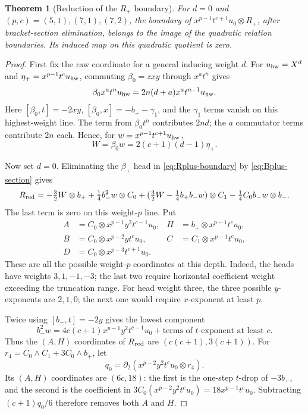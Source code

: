 \documentclass[11pt]{article}
\theoremstyle{plain}
\newtheorem{theorem}{Theorem}[section]
\theoremstyle{definition}
\theoremstyle{remark}
\numberwithin{equation}{section}
\begin{document}
\begin{theorem}[Reduction of the $R_+$ boundary]\label{thm:frob-scalar}
For $d=0$ and $(p,c)=(5,1),(7,1),(7,2)$, the boundary of
$x^{p-1}t^{c+1}u_0\otimes R_+$, after bracket-section elimination,
belongs to the image of the quadratic relation boundaries.
Its induced map on this quadratic quotient is zero.
\end{theorem}
\begin{proof}
First fix the raw coordinate for a general inducing weight $d$.
For $u_{\rm hw}=X^d$ and $\eta_+=x^{p-1}t^cu_{\rm hw}$,
commuting $\beta_0=zxy$ through $x^at^n$ gives
\[
 \beta_0x^at^nu_{\rm hw}=2n(d+a)x^at^{n-1}u_{\rm hw}.
\]
Here $[\beta_0,t]=-2xy$, $[\beta_0,x]=-b_+-\gamma_1$, and
the $\gamma_1$ terms vanish on this highest-weight line.
The term from $\beta_0t^n$ contributes $2nd$; the $a$ commutator
terms contribute $2n$ each. Hence, for $w=x^{p-1}t^{c+1}u_{\rm hw}$,
\begin{equation}\label{eq:lambda-c}
 W=\beta_0w=2(c+1)(d-1)\eta_+.
\end{equation}

Now set $d=0$. Eliminating the $\beta_+$ head in
\eqref{eq:Rplus-boundary} by \eqref{eq:Bplus-section} gives
\[
 R_{\rm red}=-\tfrac32W\otimes b_+
       +\tfrac14 b_-^2w\otimes C_0
       +(\tfrac32W-\tfrac14b_+b_-w)\otimes C_1
       -\tfrac14 C_0b_-w\otimes b_-.
\]
The last term is zero on this weight-$p$ line.
Put
\begin{align*}
 A&=C_0\otimes x^{p-1}y^2t^{c-1}u_0,&
 H&=b_+\otimes x^{p-1}t^cu_0,\\
 B&=C_0\otimes x^{p-2}yt^cu_0,&
 C&=C_1\otimes x^{p-1}t^cu_0,\\
 D&=C_0\otimes x^{p-3}t^{c+1}u_0.&&
\end{align*}
These are all the possible weight-$p$ coordinates at this depth.
Indeed, the heads have weights $3,1,-1,-3$; the last two require
horizontal coefficient weight exceeding the truncation range.
For head weight three, the three possible $y$-exponents are $2,1,0$;
the next one would require $x$-exponent at least $p$.

Twice using $[b_-,t]=-2y$ gives the lowest component
\[
 b_-^2w=4c(c+1)x^{p-1}y^2t^{c-1}u_0+\text{terms of $t$-exponent at least $c$}.
\]
Thus the $(A,H)$ coordinates of $R_{\rm red}$ are
$(c(c+1),3(c+1))$.
For $r_4=C_0\wedge C_1+3C_0\wedge b_+$, let
\[
 q_0=\partial_2(x^{p-2}y^2t^cu_0\otimes r_4).
\]
Its $(A,H)$ coordinates are $(6c,18)$: the first is the one-step
$t$-drop of $-3b_+$, and the second is the coefficient in
$3C_0(x^{p-2}y^2t^cu_0)=18x^{p-1}t^cu_0$.
Subtracting $(c+1)q_0/6$ therefore removes both $A$ and $H$.


\end{proof}
\end{document}
